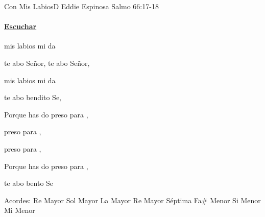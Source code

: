 \documentclass[12pt, spanish]{book}
\newcommand{\NotCCLIed}{\relax}
\begin{document}
    \begin{song}{Con Mis Labios}{D}
        {} %
        {Eddie Espinosa}
        {Salmo 66:17-18} %
        {} %
        \ifChordBk
        \paragraph{\mbox{}\hfill\protect\href{https://open.spotify.com/intl-es/track/4nPQP5H4KSFIELbzj3SEQC?si=2c4442fba5e5403c}{Escuchar}\mbox{}\hfill}
        \fi

        \begin{SBOpGroup}
             mis labios  mi da

            te abo Señor, te abo Señor,

             mis labios  mi da

            te abo bendito Se,
        \end{SBOpGroup}

        \begin{SBChorus}
            Porque  has do preso para ,

            preso para ,

            preso para ,

            Porque  has do preso para ,

            te abo bento Se
        \end{SBChorus}

        \ifChordBk
        \begin{SBOpGroup}
            Acordes:
            \upchord{\D}\qquad Re Mayor \hfill
            \upchord{\G}\qquad Sol Mayor \hfill\null\break
            \upchord{\A}\qquad La Mayor \hfill
            \upchord{\Dseven}\qquad Re Mayor S\'eptima \hfill\null\break
            \upchord{\Fsm}\qquad Fa\# Menor \hfill
            \upchord{\Bm}\qquad Si Menor \hfill\null\break
            \upchord{\Em}\qquad Mi Menor \hfill
        \end{SBOpGroup}
        \fi
    \end{song}
\end{document}
